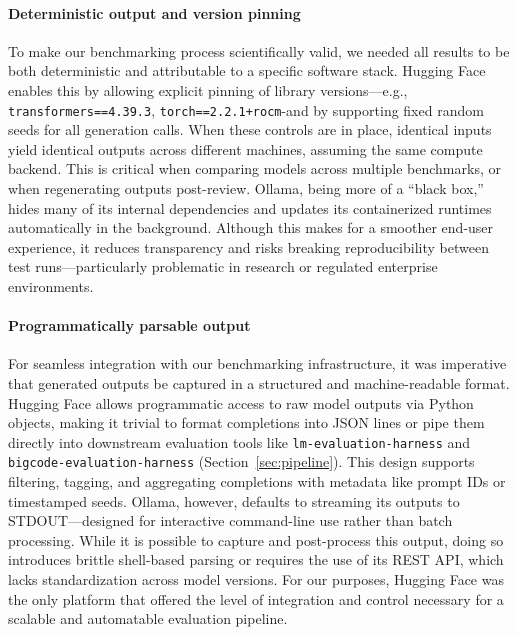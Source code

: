 \paragraph{Deterministic output and version pinning}
To make our benchmarking process scientifically valid, we needed all results to be both deterministic and attributable to a specific software stack. Hugging Face enables this by allowing explicit pinning of library versions---e.g., \texttt{transformers==4.39.3}, \texttt{torch==2.2.1+rocm}-and by supporting fixed random seeds for all generation calls. When these controls are in place, identical inputs yield identical outputs across different machines, assuming the same compute backend. This is critical when comparing models across multiple benchmarks, or when regenerating outputs post-review. Ollama, being more of a “black box,” hides many of its internal dependencies and updates its containerized runtimes automatically in the background. Although this makes for a smoother end-user experience, it reduces transparency and risks breaking reproducibility between test runs---particularly problematic in research or regulated enterprise environments.

\paragraph{Programmatically parsable output}
For seamless integration with our benchmarking infrastructure, it was imperative that generated outputs be captured in a structured and machine-readable format. Hugging Face allows programmatic access to raw model outputs via Python objects, making it trivial to format completions into JSON lines or pipe them directly into downstream evaluation tools like \texttt{lm-evaluation-harness} and \texttt{bigcode-evaluation-harness} (Section~\ref{sec:pipeline}). This design supports filtering, tagging, and aggregating completions with metadata like prompt IDs or timestamped seeds. Ollama, however, defaults to streaming its outputs to STDOUT---designed for interactive command-line use rather than batch processing. While it is possible to capture and post-process this output, doing so introduces brittle shell-based parsing or requires the use of its REST API, which lacks standardization across model versions. For our purposes, Hugging Face was the only platform that offered the level of integration and control necessary for a scalable and automatable evaluation pipeline.


